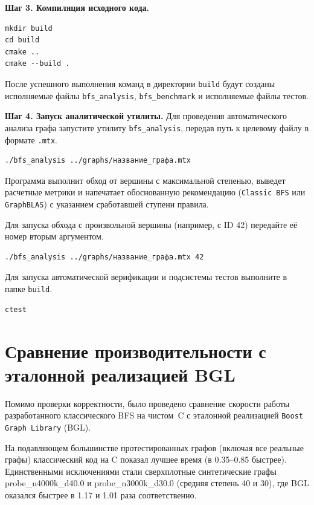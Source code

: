 \documentclass[a4paper]{article}
\begin{document}
\textbf{Шаг 3. Компиляция исходного кода.}

\begin{verbatim}
mkdir build
cd build
cmake ..
cmake --build .
\end{verbatim}

После успешного выполнения команд в директории \texttt{build} будут созданы исполняемые файлы \texttt{bfs\_analysis}, \texttt{bfs\_benchmark} и исполняемые файлы тестов.

\textbf{Шаг 4. Запуск аналитической утилиты.}
Для проведения автоматического анализа графа запустите утилиту \texttt{bfs\_analysis}, передав путь к целевому файлу в формате \texttt{.mtx}.

\begin{verbatim}
./bfs_analysis ../graphs/название_графа.mtx
\end{verbatim}
Программа выполнит обход от вершины с максимальной степенью, выведет расчетные метрики и напечатает обоснованную рекомендацию (\texttt{Classic BFS} или \texttt{GraphBLAS}) с указанием сработавшей ступени правила.

Для запуска обхода с произвольной вершины (например, с ID 42) передайте её номер вторым аргументом.

\begin{verbatim}
./bfs_analysis ../graphs/название_графа.mtx 42
\end{verbatim}

Для запуска автоматической верификации и подсистемы тестов выполните в папке \texttt{build}.

\begin{verbatim}
ctest
\end{verbatim}

\section{Сравнение производительности с эталонной реализацией BGL}

Помимо проверки корректности, было проведено сравнение скорости работы разработанного классического BFS на чистом~C с эталонной реализацией \texttt{Boost Graph Library} (BGL).

На подавляющем большинстве протестированных графов (включая все реальные графы) классический код на C показал лучшее время (в 0.35--0.85 быстрее). Единственными исключениями стали сверхплотные синтетические графы probe\_n4000k\_d40.0 и probe\_n3000k\_d30.0 (средняя степень 40 и 30), где BGL оказался быстрее в 1.17 и 1.01 раза соответственно.
\end{document}
